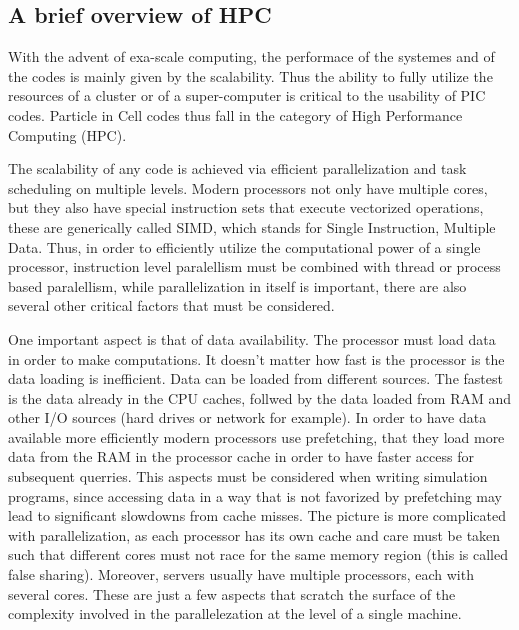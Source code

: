 \documentclass[12pt, class=report, crop=false]{standalone}
\begin{document}
\subsection{A brief overview of HPC}

With the advent of exa-scale computing, the performace of the systemes and of the
codes is mainly given by the scalability.
Thus the ability to fully utilize the resources of a cluster or of a super-computer
is critical to the usability of PIC codes. Particle in Cell codes thus fall in
the category of High Performance Computing (HPC).

The scalability of any code is achieved via efficient parallelization and task
scheduling on multiple levels.
Modern processors not only have multiple cores, but they also have special instruction
sets that execute vectorized operations, these are generically called SIMD, which
stands for Single Instruction, Multiple Data. Thus, in order to efficiently utilize
the computational power of a single processor, instruction level paralellism must
be combined with thread or process based paralellism, while parallelization in
itself is important, there are also several other critical factors that must be
considered.

One important aspect is that of data availability. The processor must load data
in order to make computations. It doesn't matter how fast is the processor is the
data loading is inefficient. Data can be loaded from different sources. The
fastest is the data already in the CPU caches, follwed by the data loaded from RAM
and other I/O sources (hard drives or network for example). In order to have data
available more efficiently modern processors use prefetching, that they load more
data from the RAM in the processor cache in order to have faster access for subsequent
querries. This aspects must be considered when writing simulation programs, since
accessing data in a way that is not favorized by prefetching may lead to significant
slowdowns from cache misses. The picture is more complicated with parallelization,
as each processor has its own cache and care must be taken such that different
cores must not race for the same memory region (this is called false sharing).
Moreover, servers usually have multiple processors, each with several cores.
These are just a few aspects that scratch the surface of the complexity involved
in the parallelezation at the level of a single machine.
\end{document}
